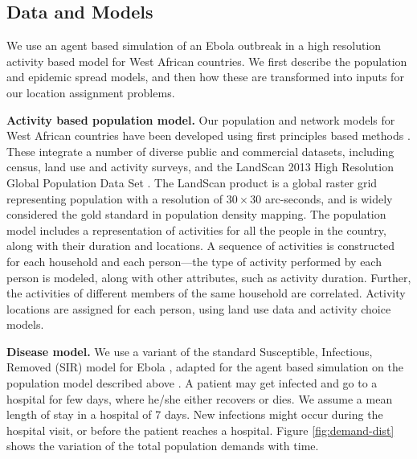 \subsection*{Data and Models}
We use an agent based simulation of an Ebola outbreak in a high resolution activity based model for 
West African countries.
We first describe the population and epidemic spread models, and then how these are transformed into
inputs for our location assignment problems.

\noindent
\textbf{Activity based population model.}
Our population and network models for West African countries
have been developed using first principles based methods \cite{barrett:wsc09,eubank:nature04}.
These integrate a number of diverse public and commercial datasets, including census, 
land use and activity surveys, and the LandScan 2013 High Resolution Global Population Data Set \cite{LandScan}.
The LandScan product is a global raster grid representing population with a resolution of 
$30 \times 30$ arc-seconds, and is widely considered the gold standard in population density mapping. 
The population model includes a representation of activities for all the people in the country,
along with their duration and locations. 
A sequence of activities is constructed for each household and each person---the type of activity 
performed by each person is modeled, along with other attributes,
such as activity duration. Further, the activities of different members of the same household are correlated.
Activity locations are assigned for each person, using land use data and activity choice models.

\noindent
\textbf{Disease model.}
We use a variant of the standard Susceptible, Infectious, Removed (SIR) model for 
Ebola \cite{legrand_grais_boelle_valleron_flahault_2007}, adapted for the 
agent based simulation on the population model described above \cite{rivers:2014ea}.
A patient may get infected and go to a hospital for few days, where he/she either recovers or dies.
We assume a mean length of stay in a hospital of 7 days. New infections might occur during
the hospital visit, or before the patient reaches a hospital. 
Figure \ref{fig:demand-dist} shows the variation of the total population demands with time.


